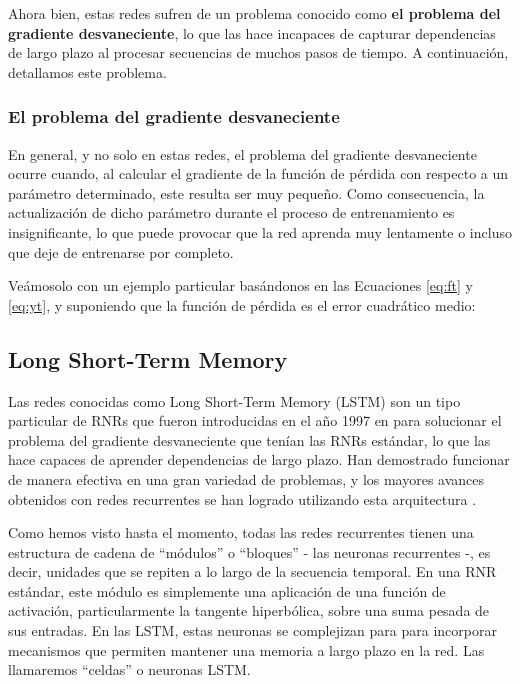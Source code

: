 \documentclass[../../main.tex]{subfiles}
\begin{document}
Ahora bien, estas redes sufren de un problema conocido como \textbf{el problema del
gradiente desvaneciente}, lo que las hace incapaces de capturar dependencias de largo
plazo al procesar secuencias de muchos pasos de tiempo. A continuación, detallamos
este problema.

\subsubsection{El problema del gradiente desvaneciente}
En general, y no solo en estas redes, el problema del gradiente desvaneciente ocurre
cuando, al calcular el gradiente de la función de pérdida con respecto a un parámetro
determinado, este resulta ser muy pequeño. Como consecuencia, la actualización de dicho
parámetro durante el proceso de entrenamiento es insignificante, lo que puede provocar que
la red aprenda muy lentamente o incluso que deje de entrenarse por completo.

Veámosolo con un ejemplo particular basándonos en las Ecuaciones \ref{eq:ft} y \ref{eq:yt},
y suponiendo que la función de pérdida es el error cuadrático medio:


\subsection{Long Short-Term Memory}
Las redes conocidas como Long Short-Term Memory (LSTM) son un tipo particular de RNRs que
fueron introducidas en el año 1997 en \cite{lstm-paper-1997} para solucionar el problema
del gradiente desvaneciente que tenían las RNRs estándar, lo que las hace capaces de
aprender dependencias de largo plazo. Han demostrado funcionar de manera efectiva en una
gran variedad de problemas, y los mayores avances obtenidos con redes recurrentes se han
logrado utilizando esta arquitectura \cite{colahs-blog-lstm-2015}.

Como hemos visto hasta el momento, todas las redes recurrentes tienen una estructura de
cadena de ``módulos'' o ``bloques'' \cite{colahs-blog-lstm-2015} - las neuronas
recurrentes -, es decir, unidades que se repiten a lo largo de la secuencia temporal. En
una RNR estándar, este módulo es simplemente una aplicación de una función de activación,
particularmente la tangente hiperbólica, sobre una suma pesada de sus entradas. En las
LSTM, estas neuronas se complejizan para para incorporar mecanismos que permiten mantener
una memoria a largo plazo en la red. Las llamaremos ``celdas'' o neuronas LSTM.
\end{document}
